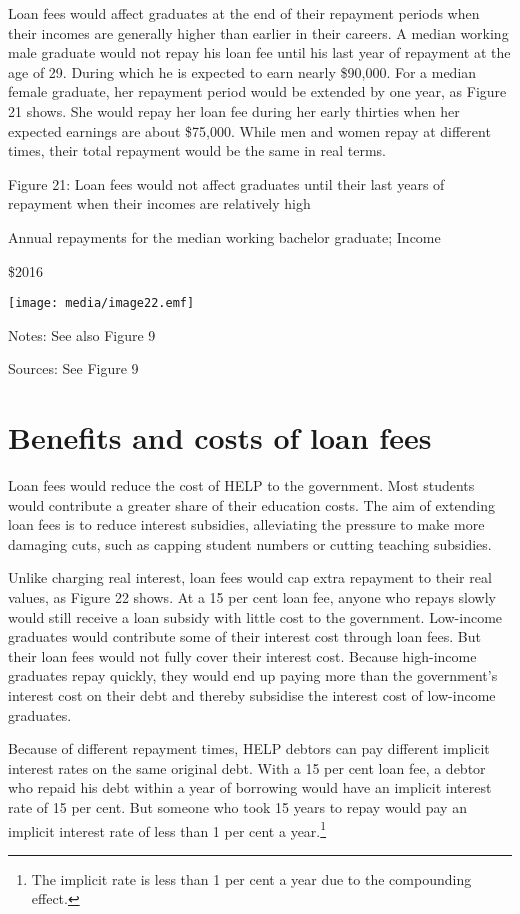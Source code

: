 \documentclass[]{book}
\begin{document}
Loan fees would affect graduates at the end of their repayment periods when their incomes are generally higher than earlier in their careers. A median working male graduate would not repay his loan fee until his last year of repayment at the age of 29. During which he is expected to earn nearly \$90,000. For a median female graduate, her repayment period would be extended by one year, as Figure 21 shows. She would repay her loan fee during her early thirties when her expected earnings are about \$75,000. While men and women repay at different times, their total repayment would be the same in real terms.

\protect\hypertarget{_Ref340827832}{}{}Figure 21: Loan fees would not affect graduates until their last years of repayment when their incomes are relatively high

Annual repayments for the median working bachelor graduate; Income

\$2016

\texttt{[image: media/image22.emf]}

Notes: See also Figure 9

Sources: See Figure 9

\section{Benefits and costs of loan fees}\label{benefits-and-costs-of-loan-fees}

Loan fees would reduce the cost of HELP to the government. Most students would contribute a greater share of their education costs. The aim of extending loan fees is to reduce interest subsidies, alleviating the pressure to make more damaging cuts, such as capping student numbers or cutting teaching subsidies.

Unlike charging real interest, loan fees would cap extra repayment to their real values, as Figure 22 shows. At a 15 per cent loan fee, anyone who repays slowly would still receive a loan subsidy with little cost to the government. Low-income graduates would contribute some of their interest cost through loan fees. But their loan fees would not fully cover their interest cost. Because high-income graduates repay quickly, they would end up paying more than the government's interest cost on their debt and thereby subsidise the interest cost of low-income graduates.

Because of different repayment times, HELP debtors can pay different implicit interest rates on the same original debt. With a 15 per cent loan fee, a debtor who repaid his debt within a year of borrowing would have an implicit interest rate of 15 per cent. But someone who took 15 years to repay would pay an implicit interest rate of less than 1 per cent a year.\footnote{The implicit rate is less than 1 per cent a year due to the compounding effect.}
\end{document}
